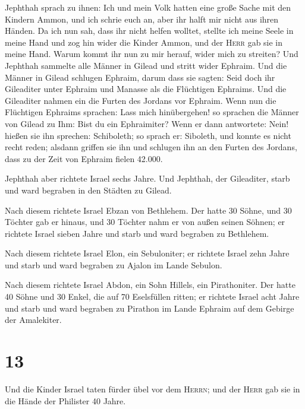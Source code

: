  Jephthah sprach zu ihnen: Ich und mein Volk hatten eine
große Sache mit den Kindern Ammon, und ich schrie euch an, aber ihr
halft mir nicht aus ihren Händen.  Da ich nun sah, dass
ihr nicht helfen wolltet, stellte ich meine Seele in meine Hand und zog
hin wider die Kinder Ammon, und der \textsc{Herr} gab sie in meine Hand.
Warum kommt ihr nun zu mir herauf, wider mich zu streiten?
 Und Jephthah sammelte alle Männer in Gilead und stritt
wider Ephraim. Und die Männer in Gilead schlugen Ephraim, darum dass sie
sagten: Seid doch ihr Gileaditer unter Ephraim und Manasse als die
Flüchtigen Ephraims.  Und die Gileaditer nahmen ein die
Furten des Jordans vor Ephraim. Wenn nun die Flüchtigen Ephraims
sprachen: Lass mich hinübergehen! so sprachen die Männer von Gilead zu
Ihm: Bist du ein Ephraimiter? Wenn er dann antwortete: Nein!
 hießen sie ihn sprechen: Schiboleth; so sprach er:
Siboleth, und konnte es nicht recht reden; alsdann griffen sie ihn und
schlugen ihn an den Furten des Jordans, dass zu der Zeit von Ephraim
fielen 42.000.

 Jephthah aber richtete Israel sechs Jahre. Und Jephthah,
der Gileaditer, starb und ward begraben in den Städten zu Gilead.

 Nach diesem richtete Israel Ebzan von Bethlehem.
 Der hatte 30 Söhne, und 30 Töchter gab er hinaus, und 30
Töchter nahm er von außen seinen Söhnen; er richtete Israel sieben Jahre
 und starb und ward begraben zu Bethlehem.

 Nach diesem richtete Israel Elon, ein Sebuloniter; er
richtete Israel zehn Jahre  und starb und ward begraben
zu Ajalon im Lande Sebulon.

 Nach diesem richtete Israel Abdon, ein Sohn Hillels, ein
Pirathoniter.  Der hatte 40 Söhne und 30 Enkel, die auf
70 Eselsfüllen ritten; er richtete Israel acht Jahre  und
starb und ward begraben zu Pirathon im Lande Ephraim auf dem Gebirge der
Amalekiter.

\hypertarget{section-12}{%
\section{13}\label{section-12}}

 Und die Kinder Israel taten fürder übel vor dem
\textsc{Herrn}; und der \textsc{Herr} gab sie in die Hände der Philister
40 Jahre.

